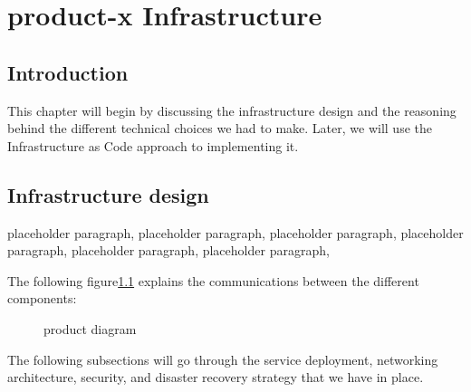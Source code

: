 \chapter{product-x Infrastructure}
\section*{Introduction}
\qquad 

This chapter will begin by discussing the infrastructure design and the reasoning behind the different technical choices we had to make. Later, we will use the Infrastructure as Code approach to implementing it. 

\label{chap_3}

\newpage
\section{Infrastructure design}

\qquad 
placeholder paragraph, placeholder paragraph, placeholder paragraph, placeholder paragraph, placeholder paragraph, placeholder paragraph,

The following figure\ref{fig:product_diagram} explains the communications between the different components:   

\begin{figure}[!h]
    \centering
    \caption{product diagram}
    \label{fig:product_diagram}
\end{figure}

The following subsections will go through the service deployment, networking architecture, security, and disaster recovery strategy that we have in place.


